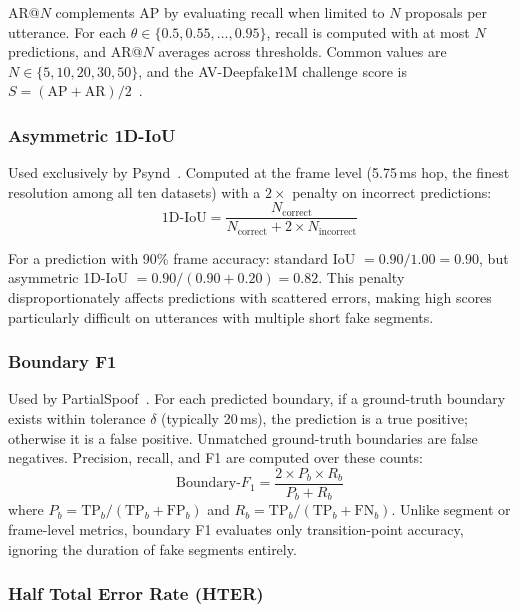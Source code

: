\documentclass[journal]{IEEEtran}
\begin{document}
AR@$N$ complements AP by evaluating recall when limited to $N$ proposals per utterance. For each $\theta \in \{0.5, 0.55, \ldots, 0.95\}$, recall is computed with at most $N$ predictions, and AR@$N$ averages across thresholds. Common values are $N \in \{5, 10, 20, 30, 50\}$, and the AV-Deepfake1M challenge score is $S = (\text{AP} + \text{AR})/2$~\cite{cai2024avdeepfake1m}.

\subsubsection{Asymmetric 1D-IoU}

Used exclusively by Psynd~\cite{zhang2022localizing}. Computed at the frame level (5.75\,ms hop, the finest resolution among all ten datasets) with a $2\times$ penalty on incorrect predictions:
\begin{equation}
\label{eq:asym_iou}
\text{1D-IoU} = \frac{N_\text{correct}}{N_\text{correct} + 2 \times N_\text{incorrect}}
\end{equation}

For a prediction with 90\% frame accuracy: standard IoU $= 0.90/1.00 = 0.90$, but asymmetric 1D-IoU $= 0.90/(0.90 + 0.20) = 0.82$. This penalty disproportionately affects predictions with scattered errors, making high scores particularly difficult on utterances with multiple short fake segments.

\subsubsection{Boundary F1}

Used by PartialSpoof~\cite{zhang2023partialspoof}. For each predicted boundary, if a ground-truth boundary exists within tolerance $\delta$ (typically 20\,ms), the prediction is a true positive; otherwise it is a false positive. Unmatched ground-truth boundaries are false negatives. Precision, recall, and F1 are computed over these counts:
\begin{equation}
\label{eq:boundary_f1}
\text{Boundary-}F_1 = \frac{2 \times P_b \times R_b}{P_b + R_b}
\end{equation}
where $P_b = \text{TP}_b / (\text{TP}_b + \text{FP}_b)$ and $R_b = \text{TP}_b / (\text{TP}_b + \text{FN}_b)$. Unlike segment or frame-level metrics, boundary F1 evaluates only transition-point accuracy, ignoring the duration of fake segments entirely.

\subsubsection{Half Total Error Rate (HTER)}
\end{document}
